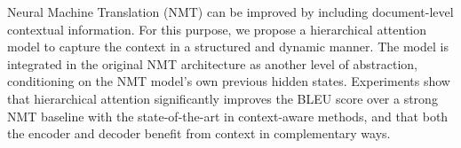 Neural Machine Translation (NMT) can be improved by including document-level contextual information. For this purpose, we propose a hierarchical attention model to capture the context in a structured and dynamic manner. The model is integrated in the original NMT architecture as another level of abstraction, conditioning on the NMT model's own previous hidden states. Experiments show that hierarchical attention significantly improves the BLEU score over a strong NMT baseline with the state-of-the-art in context-aware methods, and that both the encoder and decoder benefit from context in complementary ways.
